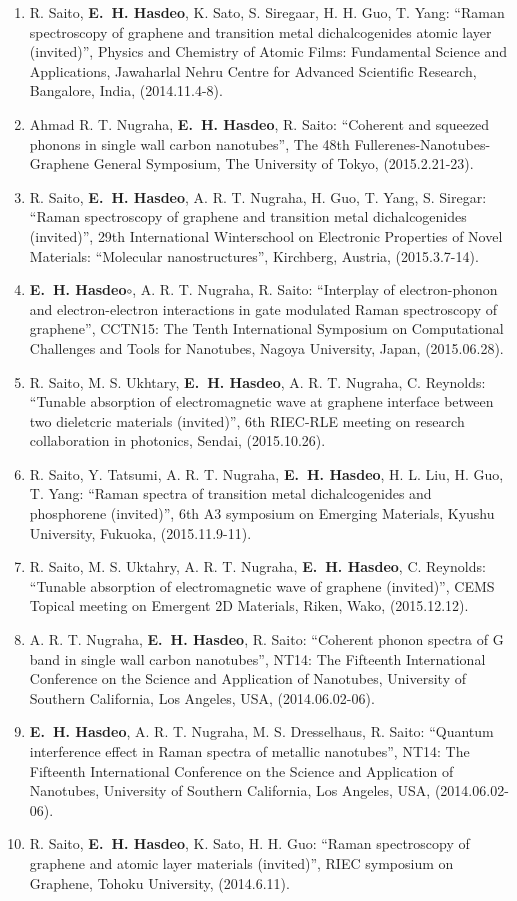 \documentclass[a4paper,11pt]{article}
\newcommand{\jjm}[5]{\item {#1}: {``#2''}, {#3}, {#5}, (#4).}
\newcommand{\rs}{R. Saito}
\def\hes{{\bf E.~H. Hasdeo}}
\begin{document}
\begin{enumerate}
% 
\jjm{\rs, \hes, K. Sato, S. Siregaar, H. H. Guo, T. Yang}
{Raman spectroscopy of graphene and transition metal dichalcogenides atomic layer (invited)}
{Physics and Chemistry of Atomic Films: Fundamental Science and Applications}
{2014.11.4-8}{Jawaharlal Nehru Centre for Advanced Scientific
  Research, Bangalore, India}
\jjm{Ahmad R. T. Nugraha, \hes, \rs} %
{Coherent and squeezed phonons in single wall carbon nanotubes}
{The 48th Fullerenes-Nanotubes-Graphene General Symposium}
{2015.2.21-23}{The University of Tokyo}

\jjm{\rs, \hes, A. R. T. Nugraha, H. Guo, T. Yang, S. Siregar}
{Raman spectroscopy of graphene and transition metal dichalcogenides (invited)}
{29th International Winterschool on Electronic Properties of Novel Materials: ``Molecular nanostructures''}
{2015.3.7-14}{Kirchberg, Austria}

\jjm{\hes$\circ$, A. R. T. Nugraha, \rs} {Interplay of
  electron-phonon and electron-electron interactions in gate modulated
  Raman spectroscopy of graphene} {CCTN15: The Tenth International
  Symposium on Computational Challenges and Tools for Nanotubes}
{2015.06.28}{Nagoya University, Japan}
\jjm{\rs, M. S. Ukhtary, \hes, A. R. T. Nugraha, C. Reynolds}
{Tunable absorption of electromagnetic wave at graphene interface between two dieletcric materials (invited)}
{6th RIEC-RLE meeting on research collaboration in photonics}
{2015.10.26}{Sendai}
\jjm{\rs, Y. Tatsumi, A. R. T. Nugraha, \hes, H. L. Liu, H. Guo, T. Yang}
{Raman spectra of transition metal dichalcogenides and phosphorene (invited)}
{6th A3 symposium on Emerging Materials, Kyushu University}
{2015.11.9-11}
{Fukuoka}
\jjm{\rs, M. S. Uktahry, A. R. T. Nugraha, \hes, C. Reynolds}
{Tunable absorption of electromagnetic wave of graphene (invited)}
{CEMS Topical meeting on Emergent 2D Materials}
{2015.12.12}{Riken, Wako}
    
\jjm{A. R. T. Nugraha, \hes, \rs}
{Coherent phonon spectra of G band in single wall carbon nanotubes}
{NT14: The Fifteenth International Conference on the Science and Application of Nanotubes}
{2014.06.02-06}{University of Southern California, Los Angeles, USA}
\jjm{\hes, A. R. T. Nugraha, M. S. Dresselhaus, \rs}
{Quantum interference effect in Raman spectra of metallic nanotubes}
{NT14: The Fifteenth International Conference on the Science and Application of Nanotubes}
{2014.06.02-06}{University of Southern California, Los Angeles, USA}
\jjm{\rs, \hes, K. Sato, H. H. Guo}
{Raman spectroscopy of graphene and atomic layer materials (invited)}
{RIEC symposium on Graphene}
{2014.6.11}{Tohoku University}


\end{enumerate}
\end{document}
